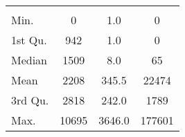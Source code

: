 \begin{tabular}{lS[table-format=5.1]S[table-format=5.1]S[table-format=5.1]}
&  &  &  \\
 Min.    & 0 & 1.0 & 0 \\
 1st Qu. & 942 & 1.0 & 0 \\
 Median  & 1509 & 8.0 & 65 \\
 Mean    & 2208 & 345.5 & 22474 \\
 3rd Qu. & 2818 & 242.0 & 1789 \\
 Max.    & 10695 & 3646.0 & 177601 \\
\end{tabular}
